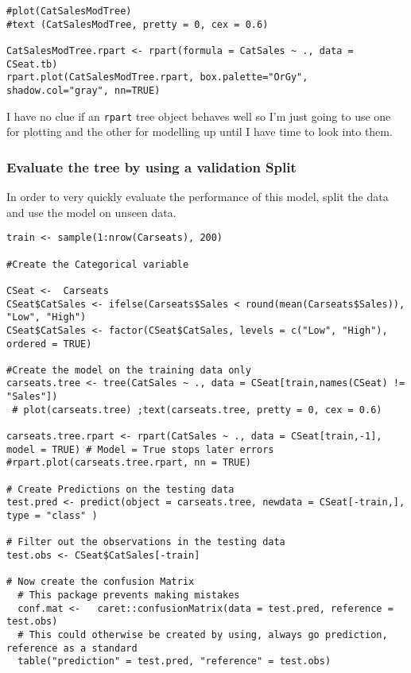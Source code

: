 \documentclass[12pt]{article}
\newcommand{\passthrough}[1]{#1}
\begin{document}
\begin{lstlisting}
#plot(CatSalesModTree)
#text (CatSalesModTree, pretty = 0, cex = 0.6)

CatSalesModTree.rpart <- rpart(formula = CatSales ~ ., data = CSeat.tb)
rpart.plot(CatSalesModTree.rpart, box.palette="OrGy", shadow.col="gray", nn=TRUE)
\end{lstlisting}

I have no clue if an \passthrough{\lstinline!rpart!} tree object behaves
well so I'm just going to use one for plotting and the other for
modelling up until I have time to look into them.

\hypertarget{evaluate-the-tree-by-using-a-validation-split}{%
\subsubsection{Evaluate the tree by using a validation
Split}\label{evaluate-the-tree-by-using-a-validation-split}}

In order to very quickly evaluate the performance of this model, split
the data and use the model on unseen data.

\begin{lstlisting}
train <- sample(1:nrow(Carseats), 200)

#Create the Categorical variable

CSeat <-  Carseats
CSeat$CatSales <- ifelse(Carseats$Sales < round(mean(Carseats$Sales)), "Low", "High")
CSeat$CatSales <- factor(CSeat$CatSales, levels = c("Low", "High"), ordered = TRUE)

#Create the model on the training data only
carseats.tree <- tree(CatSales ~ ., data = CSeat[train,names(CSeat) != "Sales"])
 # plot(carseats.tree) ;text(carseats.tree, pretty = 0, cex = 0.6)

carseats.tree.rpart <- rpart(CatSales ~ ., data = CSeat[train,-1], model = TRUE) # Model = True stops later errors
#rpart.plot(carseats.tree.rpart, nn = TRUE)

# Create Predictions on the testing data
test.pred <- predict(object = carseats.tree, newdata = CSeat[-train,], type = "class" )

# Filter out the observations in the testing data
test.obs <- CSeat$CatSales[-train]

# Now create the confusion Matrix
  # This package prevents making mistakes
  conf.mat <-   caret::confusionMatrix(data = test.pred, reference = test.obs)
  # This could otherwise be created by using, always go prediction, reference as a standard
  table("prediction" = test.pred, "reference" = test.obs)
  
\end{lstlisting}
\end{document}
